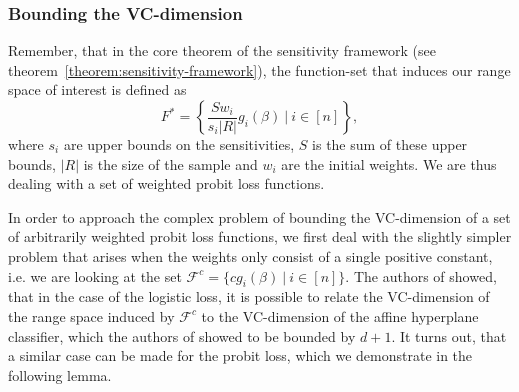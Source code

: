 \subsubsection{Bounding the VC-dimension}

Remember, that in the core theorem of the sensitivity
framework (see theorem~\ref{theorem:sensitivity-framework}),
the function-set that induces our range space of interest
is defined as
\begin{equation*}
    F^\ast = \left\{ \frac{S w_i}{s_i |R|} g_i(\beta) \ |\ i \in [n] \right\},
\end{equation*}
where $s_i$ are upper bounds on the sensitivities, $S$ is the
sum of these upper bounds, $|R|$ is the size of the sample and
$w_i$ are the initial weights.
We are thus dealing with a set of weighted probit loss functions.

In order to approach the complex problem of bounding the VC-dimension
of a set of arbitrarily weighted probit loss functions, we first
deal with the slightly simpler problem that arises when the weights
only consist of a single positive constant, i.e. we are looking at the
set $\mathcal{F}^c = \{ c g_i(\beta) \ | \ i \in [n] \}$.
The authors of \cite{scalable-bayesian-logreg} showed, that
in the case of the logistic loss,
it is possible to relate the VC-dimension of the
range space induced by $\mathcal{F}^c$ to the VC-dimension of
the affine hyperplane classifier, which the authors of
\cite{computational-learning-theory} showed to be bounded by $d + 1$.
It turns out, that a similar case can be made for the probit
loss, which we demonstrate in the following lemma.

